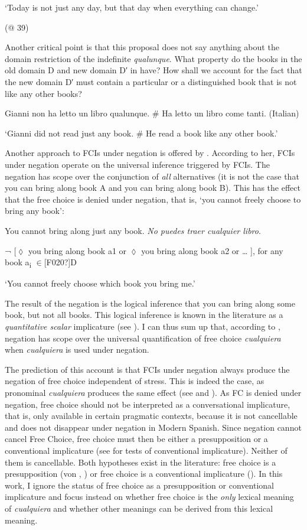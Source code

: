   ‘Today is not just any day, but that day when everything can change.’

  (@ 39)

Another critical point is that this proposal does not say anything about the domain restriction of the indefinite \textit{qualunque}. What property do the books in the old domain D and new domain D′ in  have? How shall we account for the fact that the new domain D′ must contain a particular or a distinguished book that is not like any other books?

  Gianni non ha letto un libro qualunque. \# Ha letto un libro come tanti.  (Italian)

  ‘Gianni did not read just any book. \# He read a book like any other book.’  

Another approach to FCIs under negation is offered by \citet{Aloni2007}. According to her, FCIs under negation operate on the universal inference triggered by FCIs. The negation has scope over the conjunction of \textit{all} alternatives (it is not the case that you can bring along book A and you can bring along book B). This has the effect that the free choice is denied under negation, that is, ‘you cannot freely choose to bring any book’:

\label{bkm:Ref43030327}  You cannot bring along just any book. \textit{No puedes traer cualquier libro}. 

  ¬ [${\lozenge}$ you bring along book a1 or ${\lozenge}$ you bring along book a2 or … ], for any book a\textsubscript{i} ${\in}$[F020?]D

  ‘You cannot freely choose which book you bring me.’

The result of the negation is the logical inference that you can bring along some book, but not all books. This logical inference is known in the literature as a \textit{quantitative scalar} implicature (see \citealt{Chierchia2006,Chierchia2013}). I can thus sum up that, according to \citet{Aloni2007}, negation has scope over the universal quantification of free choice \textit{cualquiera} when \textit{cualquiera} is used under negation. 

  The prediction of this account is that FCIs under negation always produce the negation of free choice independent of stress. This is indeed the case, as pronominal \textit{cualquiera} produces the same effect (see  and ). As FC is denied under negation, free choice should not be interpreted as a conversational implicature, that is, only available in certain pragmatic contexts, because it is not cancellable and does not disappear under negation in Modern Spanish. Since negation cannot cancel Free Choice, free choice must then be either a presupposition or a conventional implicature (see \citealt{Potts2005} for tests of conventional implicature). Neither of them is cancellable. Both hypotheses exist in the literature: free choice is a presupposition (von \citealt{Fintel2000}, \citealt{ChoiRomero2007}) or free choice is a conventional implicature (\citealt{Aloni2007,Aloni2021}). In this work, I ignore the status of free choice as a presupposition or conventional implicature and focus instead on whether free choice is the \textit{only} lexical meaning of \textit{cualquiera} and whether other meanings can be derived from this lexical meaning. 

